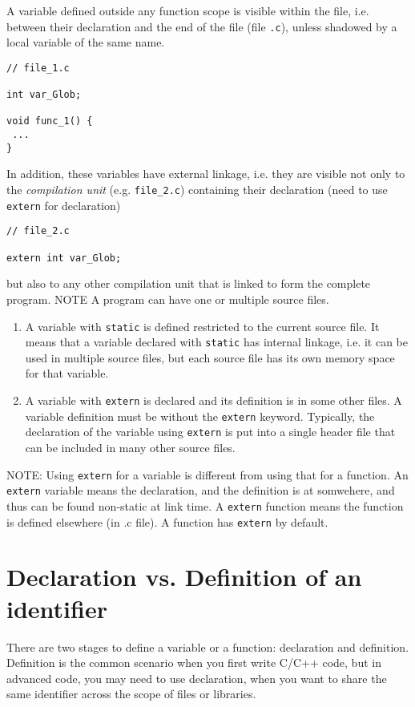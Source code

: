 A variable defined outside any function scope is visible within the file, i.e.
between their declaration and the end of the file (file \verb!.c!), unless
shadowed by a local variable of the same name. 
\begin{verbatim}
// file_1.c

int var_Glob;

void func_1() {
 ...
}
\end{verbatim}
In addition, these variables have external linkage, i.e. they are visible not
only to the {\it compilation unit} (e.g. \verb!file_2.c!) containing their
declaration (need to use \verb!extern! for declaration)
\begin{verbatim}
// file_2.c

extern int var_Glob;
\end{verbatim}
but also to any other compilation unit that is linked to form the complete
program. NOTE A program can have one or multiple source files.



\begin{enumerate}
  \item A variable with \verb!static! is defined restricted to the current
  source file. It means that a variable declared with \verb!static! has
  internal linkage, i.e. it can be used in multiple source files, but each
  source file has its own memory space for that variable.
  
  \item A variable with \verb!extern! is declared and its definition is in some
  other files. A variable definition must be without the \verb!extern! keyword.
  Typically, the declaration of the variable using \verb!extern! is put into a
  single header file that can be included in many other source files.
\end{enumerate}

NOTE: Using \verb!extern! for a variable is different from using that for a
function. An \verb!extern! variable means the declaration, and the definition is
at somwehere, and thus can be found non-static at link time. A \verb!extern!
function means the function is defined elsewhere (in .c file). A function has
\verb!extern! by default.

\section{Declaration vs. Definition of an identifier}
\label{sec:declaration_definition}

There are two stages to define a variable or a function: declaration and
definition. Definition is the common scenario when you first write C/C++ code,
but in advanced code, you may need to use declaration, when you want to share
the same identifier across the scope of files or libraries.

